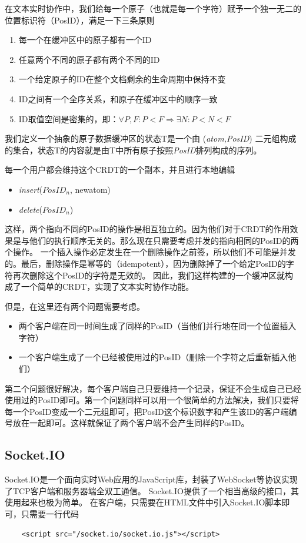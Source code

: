 \documentclass[11pt]{ctexart}
\begin{document}
在文本实时协作中，我们给每一个原子（也就是每一个字符）赋予一个独一无二的位置标识符（PosID），满足一下三条原则
\begin{enumerate}
	\item 每一个在缓冲区中的原子都有一个ID
	\item 任意两个不同的原子都有两个不同的ID
	\item 一个给定原子的ID在整个文档剩余的生命周期中保持不变
	\item ID之间有一个全序关系，和原子在缓冲区中的顺序一致
	\item ID取值空间是密集的，即：$\forall P, F : P < F \Rightarrow \exists N: P < N < F$
\end{enumerate}
我们定义一个抽象的原子数据缓冲区的状态T是一个由 (\textit{atom,PosID}) 二元组构成的集合，状态T的内容就是由T中所有原子按照\textit{PosID}排列构成的序列。 

每一个用户都会维持这个CRDT的一个副本，并且进行本地编辑
\begin{itemize}
	\item \textit{insert}($\mathit{PosID_{n}}$, newatom)
	\item \textit{delete}($\mathit{PosID_{n}}$)
\end{itemize}
这样，两个指向不同的PosID的操作是相互独立的。因为他们对于CRDT的作用效果是与他们的执行顺序无关的。那么现在只需要考虑并发的指向相同的PosID的两个操作。
一个插入操作必定发生在一个删除操作之前签，所以他们不可能是并发的。最后，删除操作是幂等的（idempotent），因为删除掉了一个给定PosID的字符再次删除这个PosID的字符是无效的。
因此，我们这样构建的一个缓冲区就构成了一个简单的CRDT，实现了文本实时协作功能。

但是，在这里还有两个问题需要考虑。
\begin{itemize}
	\item 两个客户端在同一时间生成了同样的PosID（当他们并行地在同一个位置插入字符）
	\item 一个客户端生成了一个已经被使用过的PosID（删除一个字符之后重新插入他们）
\end{itemize}

第二个问题很好解决，每个客户端自己只要维持一个记录，保证不会生成自己已经使用过的PosID即可。第一个问题同样可以用一个很简单的方法解决，我们只要将每一个PosID变成一个二元组即可，把PosID这个标识数字和产生该ID的客户端编号放在一起即可。这样就保证了两个客户端不会产生同样的PosID。
\subsection{Socket.IO}
Socket.IO是一个面向实时Web应用的JavaScript库，封装了WebSocket等协议实现了TCP客户端和服务器端全双工通信。
Socket.IO提供了一个相当高级的接口，其使用起来也极为简单。
在客户端，只需要在HTML文件中引入Socket.IO脚本即可，只需要一行代码
\begin{verbatim}
    <script src="/socket.io/socket.io.js"></script>
\end{verbatim}
\end{document}
